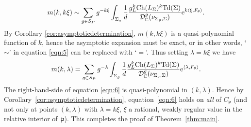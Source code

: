 \documentclass[11pt]{article}
\numberwithin{equation}{section}
\newcommand{\pair}[2]{\langle #1, #2 \rangle}
\def\p{\ensuremath{\mathfrak{p}}}
\def\bC{\ensuremath{\mathbb{C}}}
\def\Ch{\ensuremath{\textnormal{Ch}}}
\def\Td{\ensuremath{\textnormal{Td}}}
\def\calDC{\ensuremath{\mathcal{D}_{\bC}}}
\begin{document}
\begin{gather}\label{eqn:5}
m(k,k\xi)\sim \sum_{g\in S_P} g^{-k\xi} \int_{\Sigma_g} \frac{1}{d}\frac{g_L^k\Ch(L_\Sigma)^k\Td(\Sigma)}{\calDC^g(\nu_{\Sigma_g,\Sigma})}{\rm e}^{k\pair{\xi}{F_\theta}}.
\end{gather}
By Corollary \ref{cor:asymptoticdetermination}, $m(k,k\xi)$ is a quasi-polynomial function of $k$, hence the asymptotic expansion must be exact, or in other words, `$\sim$' in equation \eqref{eqn:5} can be replaced with `$=$'. Thus setting $\lambda=k\xi$ we have
\begin{gather}
\label{eqn:6}
m(k,\lambda)= \sum_{g\in S_P} g^{-\lambda} \int_{\Sigma_g} \frac{1}{d}\frac{g_L^k\Ch(L_\Sigma)^k\Td(\Sigma)}{\calDC^g(\nu_{\Sigma_g,\Sigma})}{\rm e}^{\pair{\lambda}{F_\theta}}.
\end{gather}
The right-hand-side of equation \eqref{eqn:6} is quasi-polynomial in $(k,\lambda)$. Hence by Corollary~\ref{cor:asymptoticdetermination}, equation~\eqref{eqn:6} holds on \emph{all} of $C_\p$ (and not only at points $(k,\lambda)$ with $\lambda=k\xi$, $\xi$ a rational, weakly regular value in the relative interior of~$\p$). This completes the proof of Theorem~\ref{thm:main}.
\end{document}
